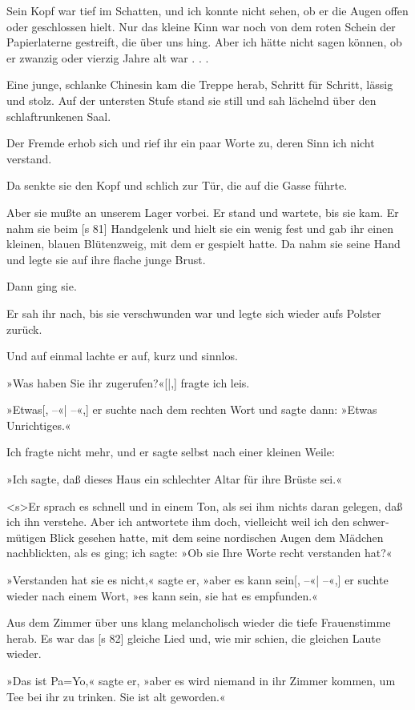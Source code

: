 Sein Kopf war tief im Schatten, und ich konnte
nicht sehen, ob er die Augen offen oder geschlossen
hielt. Nur das kleine Kinn war noch von dem roten
Schein der Papierlaterne gestreift, die über uns hing.
Aber ich hätte nicht sagen können, ob er zwanzig
oder vierzig Jahre alt war . . .

Eine junge, schlanke Chinesin kam die Treppe
herab, Schritt für Schritt, lässig und stolz. Auf der
untersten Stufe stand sie still und sah lächelnd über
den schlaftrunkenen Saal.

Der Fremde erhob sich und rief ihr ein paar
Worte zu, deren Sinn ich nicht verstand.

Da senkte sie den Kopf und schlich zur Tür,
die auf die Gasse führte.

Aber sie mußte an unserem Lager vorbei. Er
stand und wartete, bis sie kam. Er nahm sie beim
[s 81]
Handgelenk und hielt sie ein wenig fest und gab ihr
einen kleinen, blauen Blütenzweig, mit dem er gespielt
hatte. Da nahm sie seine Hand und legte sie auf
ihre flache junge Brust.

Dann ging sie.

Er sah ihr nach, bis sie verschwunden war und
legte sich wieder aufs Polster zurück.

Und auf einmal lachte er auf, kurz und sinnlos.

»Was haben Sie ihr zugerufen?«[|,] fragte ich leis.

»Etwas[, –«| –«,] er suchte nach dem rechten Wort
und sagte dann: »Etwas Unrichtiges.«

Ich fragte nicht mehr, und er sagte selbst nach
einer kleinen Weile:

»Ich sagte, daß dieses Haus ein schlechter Altar
für ihre Brüste sei.«

<s>Er sprach es schnell und in einem Ton, als sei
ihm nichts daran gelegen, daß ich ihn verstehe. Aber
ich antwortete ihm doch, vielleicht weil ich den schwer­
mütigen Blick gesehen hatte, mit dem seine nordischen
Augen dem Mädchen nachblickten, als es ging; ich
sagte: »Ob sie Ihre Worte recht verstanden hat?«

»Verstanden hat sie es nicht,« sagte er, »aber
es kann sein[, –«| –«,] er suchte wieder nach einem Wort,
»es kann sein, sie hat es empfunden.«

Aus dem Zimmer über uns klang melancholisch
wieder die tiefe Frauenstimme herab. Es war das
[s 82]
gleiche Lied und, wie mir schien, die gleichen Laute
wieder.

»Das ist Pa=Yo,« sagte er, »aber es wird niemand
in ihr Zimmer kommen, um Tee bei ihr zu trinken.
Sie ist alt geworden.«


